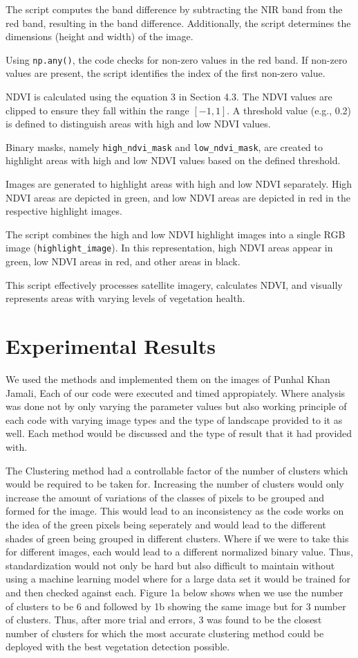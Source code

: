\documentclass[12pt,a4paper,IEEEtran]{article}
\begin{document}
The script computes the band difference by subtracting the NIR band from the red band, resulting in the band difference. Additionally, the script determines the dimensions (height and width) of the image.

Using \texttt{np.any()}, the code checks for non-zero values in the red band. If non-zero values are present, the script identifies the index of the first non-zero value.

NDVI is calculated using the equation 3 in Section 4.3.
The NDVI values are clipped to ensure they fall within the range \([-1, 1]\). A threshold value (e.g., 0.2) is defined to distinguish areas with high and low NDVI values.

Binary masks, namely \texttt{high\_ndvi\_mask} and \texttt{low\_ndvi\_mask}, are created to highlight areas with high and low NDVI values based on the defined threshold.

Images are generated to highlight areas with high and low NDVI separately. High NDVI areas are depicted in green, and low NDVI areas are depicted in red in the respective highlight images.

The script combines the high and low NDVI highlight images into a single RGB image (\texttt{highlight\_image}). In this representation, high NDVI areas appear in green, low NDVI areas in red, and other areas in black.

This script effectively processes satellite imagery, calculates NDVI, and visually represents areas with varying levels of vegetation health.


\section{Experimental Results}
We used the methods and implemented them on the images of Punhal Khan Jamali, Each of our code were executed and timed appropiately. Where analysis was done not by only varying the parameter values but also working principle of each code with varying image types and the type of landscape provided to it as well. Each method would be discussed and the type of result that it had provided with. 

The Clustering method had a controllable factor of the number of clusters which would be required to be taken for.  Increasing the number of clusters would only increase the amount of variations of the classes of pixels to be grouped and formed for the image. This would lead to an inconsistency as the code works on the idea of the green pixels being seperately and would lead to the different shades of green being grouped in different clusters. Where if we were to take this for different images, each would lead to a different normalized binary value. Thus, standardization would not only be hard but also difficult to maintain without using a machine learning model where for a large data set it would be trained for and then checked against each. Figure 1a below shows when we use the number of clusters to be 6 and followed by 1b showing the same image but for 3 number of clusters. Thus, after more trial and errors, 3 was found to be the closest number of clusters for which the most accurate clustering method could be deployed with the best vegetation detection possible.  
\end{document}
